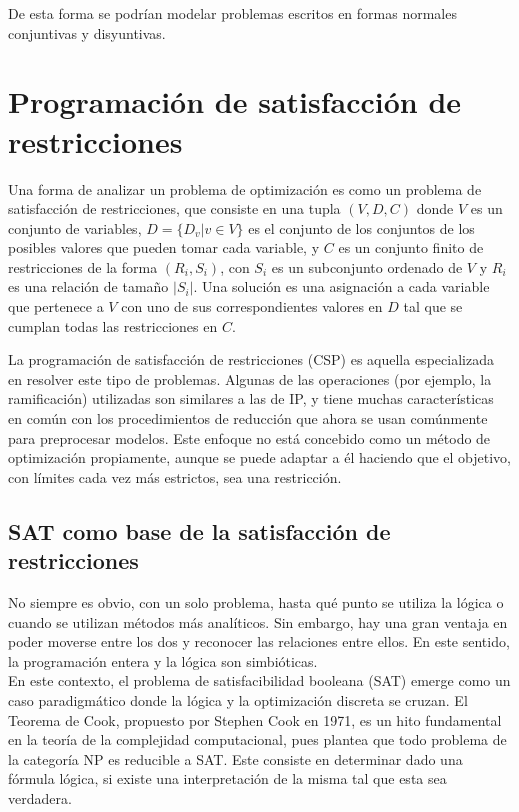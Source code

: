\documentclass[12pt]{report}
\begin{document}
De esta forma se podrían modelar problemas escritos en formas normales conjuntivas y disyuntivas.

\section{Programación de satisfacción de restricciones}

Una forma de analizar un problema de optimización es como un problema de satisfacción de restricciones, que consiste en una tupla $(V,D,C)$ donde $V$ es un conjunto de variables, $D=\{D_v|v\in V\}$ es el conjunto de los conjuntos de los posibles valores que pueden tomar cada variable, y $C$ es un conjunto finito de restricciones de la forma $(R_i,S_i)$, con $S_i$ es un subconjunto ordenado de $V$ y $R_i$ es una relación de tamaño $|S_i|$. Una solución es una asignación a cada variable que pertenece a $V$ con uno de sus correspondientes valores en $D$ tal que se cumplan todas las restricciones en $C$.

La programación de satisfacción de restricciones (CSP) es aquella especializada en resolver este tipo de problemas. Algunas de las operaciones (por ejemplo, la ramificación) utilizadas son similares a las de IP, y tiene muchas características en común con los procedimientos de reducción que ahora se usan comúnmente para preprocesar modelos. Este enfoque no está concebido como un método de optimización propiamente, aunque se puede adaptar a él haciendo que el objetivo, con límites cada vez más estrictos, sea una restricción.

\subsection{SAT como base de la satisfacción de restricciones\\}

No siempre es obvio, con un solo problema, hasta qué punto se utiliza la lógica o cuando se utilizan métodos más analíticos. Sin embargo, hay una gran ventaja en poder moverse entre los dos y reconocer las relaciones entre ellos. En este sentido, la programación entera y la lógica son simbióticas.\\

En este contexto, el problema de satisfacibilidad booleana (SAT) emerge como un caso paradigmático donde la lógica y la optimización discreta se cruzan. El Teorema de Cook, propuesto por Stephen Cook en 1971, es un hito fundamental en la teoría de la complejidad computacional, pues plantea que todo problema de la categoría NP es reducible a SAT. Este consiste en determinar dado una fórmula lógica, si existe una interpretación de la misma tal que esta sea verdadera.\\ 
\end{document}
